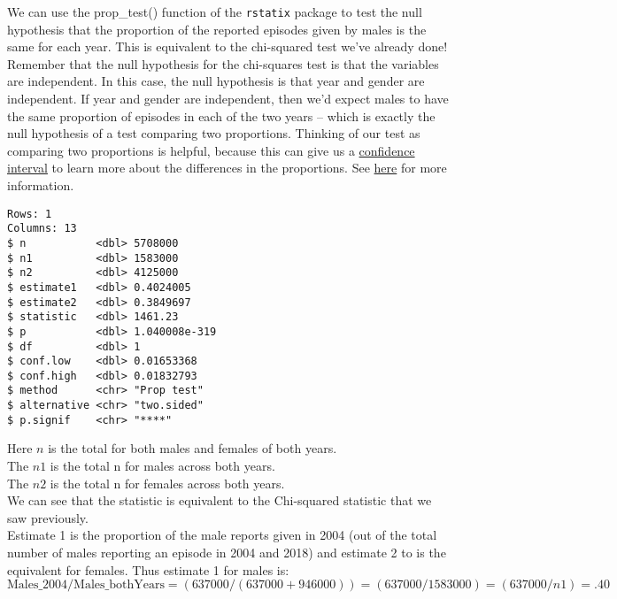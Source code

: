 \documentclass[
]{article}
\newenvironment{Shaded}{\begin{snugshade}}{\end{snugshade}}
\newcommand{\DataTypeTok}[1]{\textcolor[rgb]{0.13,0.29,0.53}{#1}}
\newcommand{\FloatTok}[1]{\textcolor[rgb]{0.00,0.00,0.81}{#1}}
\newcommand{\KeywordTok}[1]{\textcolor[rgb]{0.13,0.29,0.53}{\textbf{#1}}}
\newcommand{\NormalTok}[1]{#1}
\newcommand{\OperatorTok}[1]{\textcolor[rgb]{0.81,0.36,0.00}{\textbf{#1}}}
\newcommand{\OtherTok}[1]{\textcolor[rgb]{0.56,0.35,0.01}{#1}}
\begin{document}
We can use the prop\_test() function of the \texttt{rstatix} package to
test the null hypothesis that the proportion of the reported episodes
given by males is the same for each year. This is equivalent to the
chi-squared test we've already done! Remember that the null hypothesis
for the chi-squares test is that the variables are independent. In this
case, the null hypothesis is that year and gender are independent. If
year and gender are independent, then we'd expect males to have the same
proportion of episodes in each of the two years -- which is exactly the
null hypothesis of a test comparing two proportions. Thinking of our
test as comparing two proportions is helpful, because this can give us a
\href{https://en.wikipedia.org/wiki/Confidence_interval}{confidence
interval} to learn more about the differences in the proportions. See
\href{https://rpkgs.datanovia.com/rstatix/reference/prop_test.html}{here}
for more information.

\begin{Shaded}
\end{Shaded}

\begin{verbatim}
Rows: 1
Columns: 13
$ n           <dbl> 5708000
$ n1          <dbl> 1583000
$ n2          <dbl> 4125000
$ estimate1   <dbl> 0.4024005
$ estimate2   <dbl> 0.3849697
$ statistic   <dbl> 1461.23
$ p           <dbl> 1.040008e-319
$ df          <dbl> 1
$ conf.low    <dbl> 0.01653368
$ conf.high   <dbl> 0.01832793
$ method      <chr> "Prop test"
$ alternative <chr> "two.sided"
$ p.signif    <chr> "****"
\end{verbatim}

Here \(n\) is the total for both males and females of both years.\\
The \(n1\) is the total n for males across both years.\\
The \(n2\) is the total n for females across both years.\\
We can see that the statistic is equivalent to the Chi-squared statistic
that we saw previously.\\
Estimate 1 is the proportion of the male reports given in 2004 (out of
the total number of males reporting an episode in 2004 and 2018) and
estimate 2 to is the equivalent for females. Thus estimate 1 for males
is:
\[\text{Males_2004/Males_bothYears} = (637000/( 637000 + 946000)) = (637000/1583000) = (637000/n1) = .40\]
\end{document}
